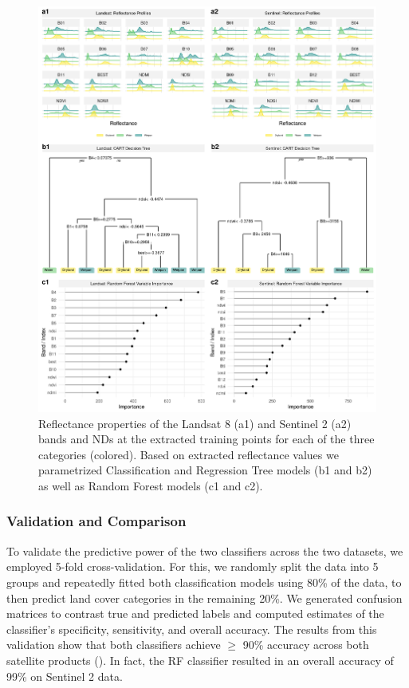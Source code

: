 \documentclass[../FinalThesis.tex]{subfiles}
\begin{document}
\begin{figure}[htpb]
 \begin{center}
  \includegraphics[width = \textwidth]{Figures/Reflectances.png}
  \caption{Reflectance properties of the Landsat 8 (a1) and Sentinel 2 (a2)
  bands and NDs at the extracted training points for each of the three
  categories (colored). Based on extracted reflectance values we parametrized
  Classification and Regression Tree models (b1 and b2) as well as Random Forest
  models (c1 and c2).}
  \label{Reflectances}
 \end{center}
\end{figure}

\subsubsection{Validation and Comparison}

To validate the predictive power of the two classifiers across the two datasets,
we employed 5-fold cross-validation. For this, we randomly split the data into 5
groups and repeatedly fitted both classification models using 80\% of the data,
to then predict land cover categories in the remaining 20\%. We generated
confusion matrices to contrast true and predicted labels and computed estimates
of the classifier's specificity, sensitivity, and overall accuracy. The results
from this validation show that both classifiers achieve $\geq$ 90\% accuracy
across both satellite products (). In fact, the
RF classifier resulted in an overall accuracy of 99\% on Sentinel 2 data.
\end{document}
